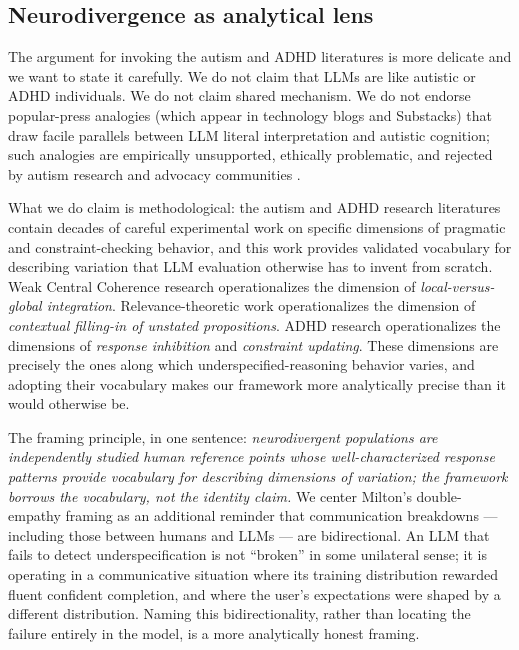 \documentclass[11pt,letterpaper]{article}
\begin{document}
\subsection{Neurodivergence as analytical lens}

The argument for invoking the autism and ADHD literatures is more delicate and we want to state it carefully. We do not claim that LLMs are like autistic or ADHD individuals. We do not claim shared mechanism. We do not endorse popular-press analogies (which appear in technology blogs and Substacks) that draw facile parallels between LLM literal interpretation and autistic cognition; such analogies are empirically unsupported, ethically problematic, and rejected by autism research and advocacy communities \citep{bottemabeutel2021}.

What we do claim is methodological: the autism and ADHD research literatures contain decades of careful experimental work on specific dimensions of pragmatic and constraint-checking behavior, and this work provides validated vocabulary for describing variation that LLM evaluation otherwise has to invent from scratch. Weak Central Coherence research operationalizes the dimension of \emph{local-versus-global integration}. Relevance-theoretic work operationalizes the dimension of \emph{contextual filling-in of unstated propositions}. ADHD research operationalizes the dimensions of \emph{response inhibition} and \emph{constraint updating}. These dimensions are precisely the ones along which underspecified-reasoning behavior varies, and adopting their vocabulary makes our framework more analytically precise than it would otherwise be.

The framing principle, in one sentence: \emph{neurodivergent populations are independently studied human reference points whose well-characterized response patterns provide vocabulary for describing dimensions of variation; the framework borrows the vocabulary, not the identity claim.} We center Milton's \citeyearpar{milton2012} double-empathy framing as an additional reminder that communication breakdowns --- including those between humans and LLMs --- are bidirectional. An LLM that fails to detect underspecification is not ``broken'' in some unilateral sense; it is operating in a communicative situation where its training distribution rewarded fluent confident completion, and where the user's expectations were shaped by a different distribution. Naming this bidirectionality, rather than locating the failure entirely in the model, is a more analytically honest framing.
\end{document}
